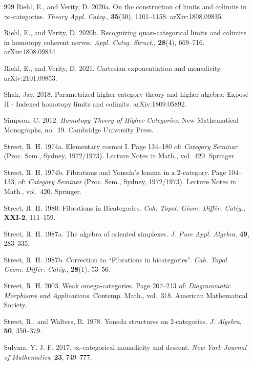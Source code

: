 \begin{thebibliography}{999}
 Riehl, E., and Verity, D. 2020a. On the construction of limits
  and colimits in $\infty$-categories. \emph{Theory Appl. Categ.},
  \textbf{35}(30), 1101--1158. arXiv:1808.09835.

 Riehl, E., and Verity, D. 2020b. Recognizing quasi-categorical
  limits and colimits in homotopy coherent nerves. \emph{Appl. Categ.
  Struct.}, \textbf{28}(4), 669--716. arXiv:1808.09834.

 Riehl, E., and Verity, D. 2021. Cartesian exponentiation and
  monadicity. arXiv:2101.09853.

 Shah, Jay. 2018. Parametrized higher category theory and higher
  algebra: Exposé II - Indexed homotopy limits and colimits. arXiv:1809.05892.

 Simpson, C. 2012. \emph{Homotopy Theory of Higher Categories}.
  New Mathematical Monographs, no.~19. Cambridge University Press.

 Street, R. H. 1974a. Elementary cosmoi I. Page 134--180 of:
  \emph{Category Seminar} (Proc. Sem., Sydney, 1972/1973). Lecture Notes in
  Math., vol.~420. Springer.

 Street, R. H. 1974b. Fibrations and Yoneda's lemma in a
  2-category. Page 104--133, of: \emph{Category Seminar} (Proc. Sem., Sydney,
  1972/1973). Lecture Notes in Math., vol.~420. Springer.

 Street, R. H. 1980. Fibrations in Bicategories. \emph{Cah.
  Topol. Géom. Différ. Catég.}, \textbf{XXI-2}, 111--159.

 Street, R. H. 1987a. The algebra of oriented simplexes.
  \emph{J. Pure Appl. Algebra}, \textbf{49}, 283--335.

 Street, R. H. 1987b. Correction to ``Fibrations in
  bicategories''. \emph{Cah. Topol. Géom. Différ. Catég.}, \textbf{28}(1),
  53--56.

 Street, R. H. 2003. Weak omega-categories. Page 207--213 of:
  \emph{Diagrammatic Morphisms and Applications}. Contemp. Math., vol.~318.
  American Mathematical Society.

 Street, R., and Walters, R. 1978. Yoneda structures on
  2-categories. \emph{J. Algebra}, \textbf{50}, 350--379.

 Sulyma, Y. J. F. 2017. $\infty$-categorical monadicity and
  descent. \emph{New York Journal of Mathematics}, \textbf{23}, 749--777.


\end{thebibliography}
